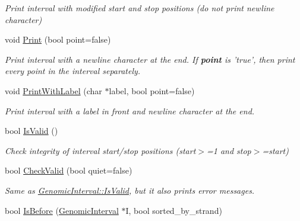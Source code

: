 \begin{DoxyCompactItemize}
\begin{DoxyCompactList}\small\item\em Print interval with modified start and stop positions (do not print newline character) \end{DoxyCompactList}\item 
\hypertarget{classGenomicInterval_a70f300009a0cc29b024853fb794d0e9a}{
void \hyperlink{classGenomicInterval_a70f300009a0cc29b024853fb794d0e9a}{Print} (bool point=false)}
\label{classGenomicInterval_a70f300009a0cc29b024853fb794d0e9a}

\begin{DoxyCompactList}\small\item\em Print interval with a newline character at the end. If {\bfseries point} is 'true', then print every point in the interval separately. \end{DoxyCompactList}\item 
\hypertarget{classGenomicInterval_adbd1571cf6db0ef646f9b1e095bfcb4e}{
void \hyperlink{classGenomicInterval_adbd1571cf6db0ef646f9b1e095bfcb4e}{PrintWithLabel} (char $\ast$label, bool point=false)}
\label{classGenomicInterval_adbd1571cf6db0ef646f9b1e095bfcb4e}

\begin{DoxyCompactList}\small\item\em Print interval with a label in front and newline character at the end. \end{DoxyCompactList}\item 
\hypertarget{classGenomicInterval_a79d1e06f62b4c1eddda7b9fc62733c7b}{
bool \hyperlink{classGenomicInterval_a79d1e06f62b4c1eddda7b9fc62733c7b}{IsValid} ()}
\label{classGenomicInterval_a79d1e06f62b4c1eddda7b9fc62733c7b}

\begin{DoxyCompactList}\small\item\em Check integrity of interval start/stop positions (start$>$=1 and stop$>$=start) \end{DoxyCompactList}\item 
\hypertarget{classGenomicInterval_ab9323c2818c13a25fda953ae18fc97aa}{
bool \hyperlink{classGenomicInterval_ab9323c2818c13a25fda953ae18fc97aa}{CheckValid} (bool quiet=false)}
\label{classGenomicInterval_ab9323c2818c13a25fda953ae18fc97aa}

\begin{DoxyCompactList}\small\item\em Same as \hyperlink{classGenomicInterval_a79d1e06f62b4c1eddda7b9fc62733c7b}{GenomicInterval::IsValid}, but it also prints error messages. \end{DoxyCompactList}\item 
\hypertarget{classGenomicInterval_a36dc2d4059337cc03a1211b6b8a7471c}{
bool \hyperlink{classGenomicInterval_a36dc2d4059337cc03a1211b6b8a7471c}{IsBefore} (\hyperlink{classGenomicInterval}{GenomicInterval} $\ast$I, bool sorted\_\-by\_\-strand)}
\label{classGenomicInterval_a36dc2d4059337cc03a1211b6b8a7471c}


\end{DoxyCompactItemize}
